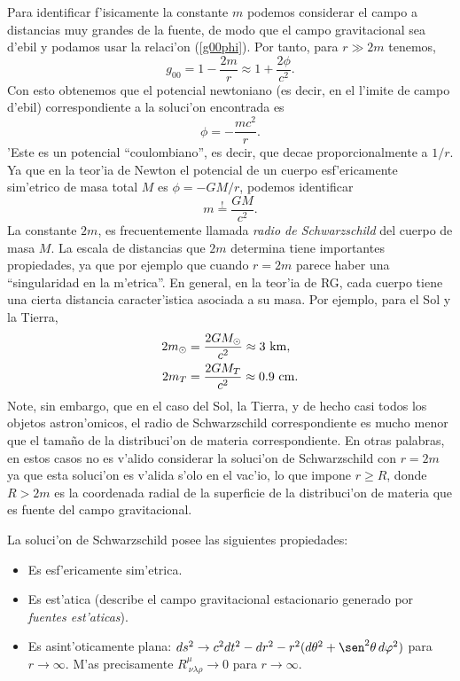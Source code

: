 Para identificar f'isicamente la constante $m$ podemos considerar el
campo a distancias muy grandes de la fuente, de modo que el campo
gravitacional sea d'ebil y podamos usar la relaci'on (\ref{g00phi}). Por
tanto, para $r\gg 2m$ tenemos,
\begin{equation}
g_{00}=1-\frac{2m}{r}\approx 1+\frac{2\phi}{c^2}.
\end{equation}
Con esto obtenemos que el potencial newtoniano (es decir, en el l'imite de
campo d'ebil) correspondiente a la soluci'on encontrada es
\begin{equation}
 \phi=-\frac{mc^2}{r}.
\end{equation}
'Este es un potencial ``coulombiano'', es decir, que decae proporcionalmente a $1/r$. Ya que en la teor'ia de Newton el potencial de un cuerpo esf'ericamente  sim'etrico de masa total $M$ es $\phi=-{GM}/ {r}$, podemos identificar
\begin{equation}\label{masa_sch}
 \boxed{m\stackrel{!}{=}\frac{GM}{c^2}.}
\end{equation}
La constante $2m$, es frecuentemente llamada \textit{radio de Schwarzschild}
del cuerpo de masa $M$. La escala de distancias que $2m$ determina tiene importantes propiedades, ya que por ejemplo que cuando $r=2m$ parece haber una
 ``singularidad en la m'etrica''. En general, en la teor'ia de RG, cada cuerpo tiene una cierta distancia caracter'istica asociada a su masa. Por ejemplo, para el Sol y la Tierra,
\begin{align}
2m_{\odot} & =\frac{2GM_\odot}{c^2}\approx 3 {\rm\ km},\\
2m_{T} & =\frac{2GM_T	}{c^2}\approx 0.9{\rm \ cm}.
\end{align}
Note, sin embargo, que en el caso del Sol, la Tierra, y de hecho casi todos los objetos astron'omicos, el radio de Schwarzschild correspondiente es mucho menor que el tama\~no de la distribuci'on de materia correspondiente. En otras palabras, en estos casos no es v'alido considerar la soluci'on de Schwarzschild con $r=2m$ ya que esta soluci'on es v'alida s'olo en el vac'io, lo que impone $r\ge R$, donde $R>2m$ es la coordenada radial de la superficie de la distribuci'on de materia que es fuente del campo gravitacional.

La soluci'on de Schwarzschild posee las siguientes propiedades:
\begin{itemize}
\item Es esf'ericamente sim'etrica.
\item Es est'atica (describe el campo gravitacional estacionario generado por \textit{fuentes est'aticas}).
\item Es asint'oticamente plana: $ds^2\to c^2dt^2-dr^2-r^2(d\theta^2+\sen^2\theta\,d\varphi^2)$ para $r\to\infty$. M'as precisamente $R^\mu_{\ \nu\lambda\rho}\to 0$ para $r\to\infty$.
\end{itemize}



